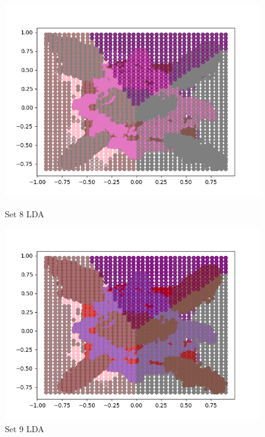 \documentclass{article}
\begin{document}
\begin{figure}[H]
	\centering
	\begin{minipage}{.33\textwidth}
			\centering
			\includegraphics[width=1\linewidth]{../set8LDAdecisions.png}
			\caption{Set 8 LDA}
	\end{minipage}\hfill
        \centering
	\begin{minipage}{.33\textwidth}
			\centering
			\includegraphics[width=1\linewidth]{../set9LDAdecisions.png}
			\caption{Set 9 LDA}
	\end{minipage}\hfill
        \centering
	\begin{minipage}{.33\textwidth}
			\centering

\end{minipage}
\end{figure}
\end{document}
